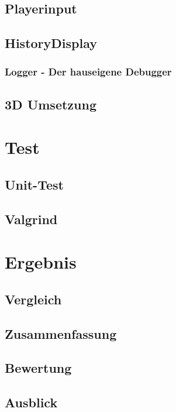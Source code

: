 \documentclass[a4paper]{scrartcl}
\begin{document}
\subsection{Playerinput}\label{Playerinput}
\subsection{HistoryDisplay}\label{HistoryDisplay}


\subsubsection{Logger - Der hauseigene Debugger}\label{Logger}

\subsection{3D Umsetzung}\label{3DUmsetzung}

\section{Test}\label{Test}
\subsection{Unit-Test}\label{Unit}
\subsection{Valgrind}\label{Valgrind}

\section{Ergebnis}\label{Ergebnis}
\subsection{Vergleich}\label{Vergleich}
\subsection{Zusammenfassung}\label{Zusammenfassung}
\subsection{Bewertung}\label{Bewertung}
\subsection{Ausblick}\label{Ausblick}
\end{document}
